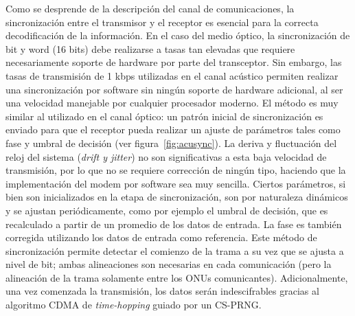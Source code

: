 Como se desprende de la descripción del canal de comunicaciones, la sincronización entre el transmisor y el receptor es esencial para la correcta decodificación de la información. 
En el caso del medio óptico, la sincronización de bit y word (16 bits) debe realizarse a tasas tan elevadas que requiere necesariamente soporte de hardware por parte del transceptor.
Sin embargo, las tasas de transmisión de 1 kbps utilizadas en el canal acústico permiten realizar una sincronización por software sin ningún soporte de hardware adicional, al ser una velocidad manejable por cualquier procesador moderno.
El método es muy similar al utilizado en el canal óptico: un patrón inicial de sincronización es enviado para que el receptor pueda realizar un ajuste de parámetros tales como fase y umbral de decisión (ver figura~\ref{fig:acusync}). La deriva y fluctuación del reloj del sistema (\textit{drift y jitter}) no son significativas a esta baja velocidad de transmisión, por lo que no se requiere corrección de ningún tipo, haciendo que la implementación del modem por software sea muy sencilla.
Ciertos parámetros, si bien son inicializados en la etapa de sincronización, son por naturaleza dinámicos y se ajustan periódicamente, como por ejemplo el umbral de decisión, que es recalculado a partir de un promedio de los datos de entrada. La fase es también corregida utilizando los datos de entrada como referencia. Este método de sincronización permite detectar el comienzo de la trama a su vez que se ajusta a nivel de bit; ambas alineaciones son necesarias en cada comunicación (pero la alineación de la trama solamente entre los ONUs comunicantes). Adicionalmente, una vez comenzada la transmisión, los datos serán indescifrables gracias al algoritmo CDMA de \textit{time-hopping} guiado por un CS-PRNG.



